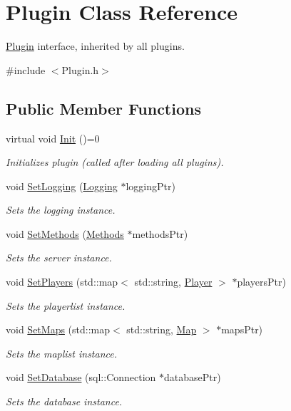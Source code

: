\hypertarget{classPlugin}{\section{Plugin Class Reference}
\label{classPlugin}
}


\hyperlink{classPlugin}{Plugin} interface, inherited by all plugins.  




{\ttfamily \#include $<$Plugin.\-h$>$}

\subsection*{Public Member Functions}
\begin{DoxyCompactItemize}
\item 
\hypertarget{classPlugin_a1409a14522799cb9d1a41fabc40133e5}{virtual void \hyperlink{classPlugin_a1409a14522799cb9d1a41fabc40133e5}{Init} ()=0}\label{classPlugin_a1409a14522799cb9d1a41fabc40133e5}

\begin{DoxyCompactList}\small\item\em Initializes plugin (called after loading all plugins). \end{DoxyCompactList}\item 
void \hyperlink{classPlugin_ae5ceb206ba4ec62f2d8c21b9117ea411}{Set\-Logging} (\hyperlink{classLogging}{Logging} $\ast$logging\-Ptr)
\begin{DoxyCompactList}\small\item\em Sets the logging instance. \end{DoxyCompactList}\item 
void \hyperlink{classPlugin_a86c23967641a554f053148ec072e393a}{Set\-Methods} (\hyperlink{classMethods}{Methods} $\ast$methods\-Ptr)
\begin{DoxyCompactList}\small\item\em Sets the server instance. \end{DoxyCompactList}\item 
void \hyperlink{classPlugin_ae7061592fc0fe1d22a7d2ad4989f78ae}{Set\-Players} (std\-::map$<$ std\-::string, \hyperlink{structPlayer}{Player} $>$ $\ast$players\-Ptr)
\begin{DoxyCompactList}\small\item\em Sets the playerlist instance. \end{DoxyCompactList}\item 
void \hyperlink{classPlugin_a72ace5f9e59a5cba484f4ec30e36e390}{Set\-Maps} (std\-::map$<$ std\-::string, \hyperlink{structMap}{Map} $>$ $\ast$maps\-Ptr)
\begin{DoxyCompactList}\small\item\em Sets the maplist instance. \end{DoxyCompactList}\item 
void \hyperlink{classPlugin_a2bc2dde47699a44792ae9de2ac228456}{Set\-Database} (sql\-::\-Connection $\ast$database\-Ptr)
\begin{DoxyCompactList}\small\item\em Sets the database instance. \end{DoxyCompactList}\end{DoxyCompactItemize}
